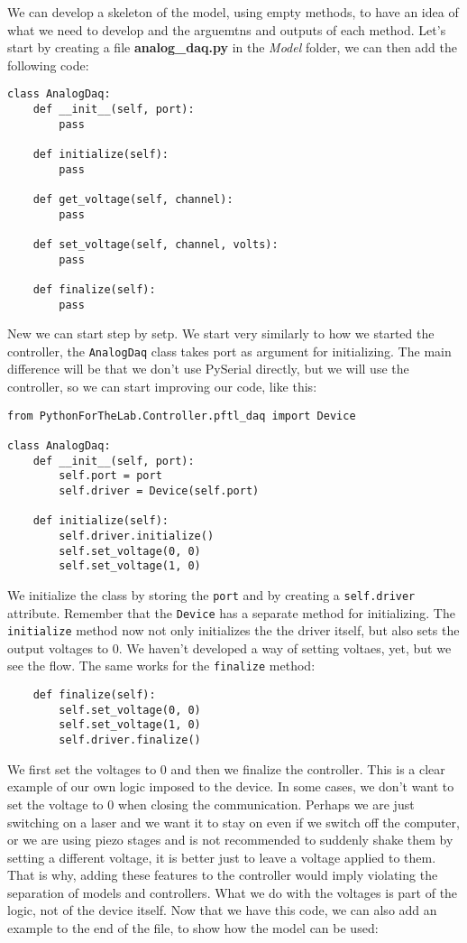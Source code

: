 We can develop a skeleton of the model, using empty methods, to have an idea of what we need to develop and the arguemtns and outputs of each method. Let's start by creating a file \textbf{analog\_daq.py} in the \emph{Model} folder, we can then add the following code:

\begin{verbatim}
class AnalogDaq:
    def __init__(self, port):
        pass

    def initialize(self):
        pass

    def get_voltage(self, channel):
        pass

    def set_voltage(self, channel, volts):
        pass

    def finalize(self):
        pass
\end{verbatim}

New we can start step by setp. We start very similarly to how we started the controller, the \texttt{AnalogDaq} class takes port as argument for initializing. The main difference will be that we don't use PySerial directly, but we will use the controller, so we can start improving our code, like this:

\begin{verbatim}
from PythonForTheLab.Controller.pftl_daq import Device

class AnalogDaq:
    def __init__(self, port):
        self.port = port
        self.driver = Device(self.port)

    def initialize(self):
        self.driver.initialize()
        self.set_voltage(0, 0)
        self.set_voltage(1, 0)
\end{verbatim}

We initialize the class by storing the \texttt{port} and by creating a \texttt{self.driver} attribute. Remember that the \texttt{Device} has a separate method for initializing. The \texttt{initialize} method now not only initializes the the driver itself, but also sets the output voltages to 0. We haven't developed a way of setting voltaes, yet, but we see the flow. The same works for the \texttt{finalize} method:

\begin{verbatim}
    def finalize(self):
        self.set_voltage(0, 0)
        self.set_voltage(1, 0)
        self.driver.finalize()
\end{verbatim}

We first set the voltages to 0 and then we finalize the controller. This is a clear example of our own logic imposed to the device. In some cases, we don't want to set the voltage to 0 when closing the communication. Perhaps we are just switching on a laser and we want it to stay on even if we switch off the computer, or we are using piezo stages and is not recommended to suddenly shake them by setting a different voltage, it is better just to leave a voltage applied to them. That is why, adding these features to the controller would imply violating the separation of models and controllers. What we do with the voltages is part of the logic, not of the device itself. Now that we have this code, we can also add an example to the end of the file, to show how the model can be used:

